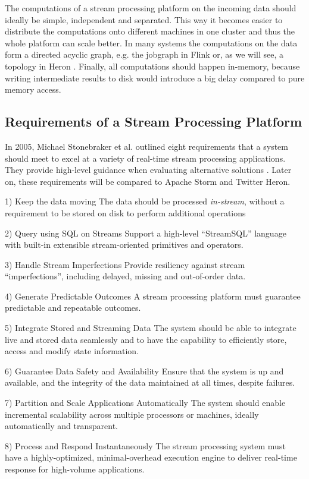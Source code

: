 \documentclass[conference]{IEEEtran}
\begin{document}
The computations of a stream processing platform on the incoming data should ideally be simple, independent and separated.
This way it becomes easier to distribute the computations onto different machines in one cluster and thus the whole platform can scale better.
In many systems the computations on the data form a directed acyclic graph, e.g. the jobgraph in Flink or, as we will see, a topology in Heron \cite{Flink}.
Finally, all computations should happen in-memory, because writing intermediate results to disk would introduce a big delay compared to pure memory access.


\subsection{Requirements of a Stream Processing Platform}
\label{sec:RequirementsOfAStreamProcessingPlatform}

In 2005, Michael Stonebraker et al. outlined eight requirements that a system should meet to excel at a variety of real-time stream processing applications.
They provide high-level guidance when evaluating alternative solutions \cite{The8Requirements}.
Later on, these requirements will be compared to Apache Storm and Twitter Heron.

\begin{LaTeXdescription}
  \item[1) Keep the data moving] The data should be processed \emph{in-stream}, without a requirement to be stored on disk to perform additional operations
  \item[2) Query using SQL on Streams] Support a high-level “StreamSQL” language with built-in extensible stream-oriented primitives and operators.
  \item[3) Handle Stream Imperfections] Provide resiliency against stream “imperfections”, including delayed, missing and out-of-order data.
  \item[4) Generate Predictable Outcomes] A stream processing platform must guarantee predictable and repeatable outcomes.
  \item[5) Integrate Stored and Streaming Data] The system should be able to integrate live and stored data seamlessly and to have the capability to efficiently store, access and modify state information.
  \item[6) Guarantee Data Safety and Availability] Ensure that the system is up and available, and the integrity of the data maintained at all times, despite failures.
  \item[7) Partition and Scale Applications Automatically] The system should enable incremental scalability across multiple processors or machines, ideally automatically and transparent.
  \item[8) Process and Respond Instantaneously] The stream processing system must have a highly-optimized, minimal-overhead execution engine to deliver real-time response for high-volume applications.
\end{LaTeXdescription}
\end{document}

